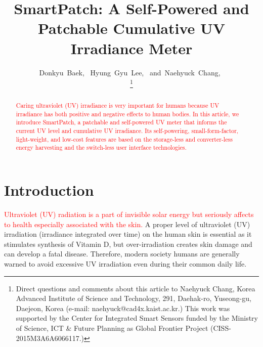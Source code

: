 \documentclass[journal]{IEEEtran}
\begin{document}
\title{SmartPatch: A Self-Powered and Patchable Cumulative UV Irradiance Meter}

\author{
	Donkyu~Baek,~
	Hyung~Gyu~Lee,~
	and~Naehyuck~Chang,~

\thanks{Direct questions and comments about this article to Naehyuck Chang, Korea Advanced Institute of Science and Technology, 291, Daehak-ro, Yuseong-gu, Daejeon, Korea (e-mail: naehyuck@cad4x.kaist.ac.kr.) This work was supported by the Center for Integrated Smart Sensors funded by the Ministry of Science, ICT \& Future Planning as Global Frontier Project (CISS-2015M3A6A6066117.)}
}

\maketitle

\begin{abstract}
\textcolor{red}{Caring ultraviolet (UV) irradiance is very important for humans because UV irradiance has both positive and negative effects to human bodies. In this article, we introduce SmartPatch, a patchable and self-powered UV meter that informs the current UV level and cumulative UV irradiance. Its self-powering, small-form-factor, light-weight, and low-cost features are based on the storage-less and converter-less energy harvesting and the switch-less user interface technologies.}
\end{abstract}



\section{Introduction}

\textcolor{red}{Ultraviolet (UV) radiation is a part of invisible solar energy but seriously affects to health especially associated with the skin.} A proper level of ultraviolet (UV) irradiation (irradiance integrated over time) on the human skin is essential as it stimulates synthesis of Vitamin D, but over-irradiation creates skin damage and can develop a fatal disease. Therefore, modern society humans are generally warned to avoid excessive UV irradiation even during their common daily life.
\end{document}
